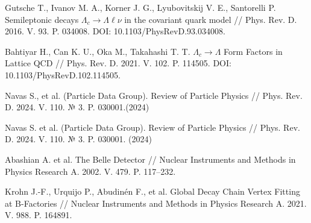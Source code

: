 \begin{thebibliography}{99}
    Gutsche T., Ivanov M. A., Korner J. G., Lyubovitskij V. E., Santorelli P. Semileptonic decays $\Lambda_c \to \Lambda \ell \nu$ in the covariant quark model // Phys. Rev. D. 2016. V. 93. P. 034008. DOI: 10.1103/PhysRevD.93.034008.    
    
    Bahtiyar H., Can K. U., Oka M., Takahashi T. T. $\Lambda_c \to \Lambda$ Form Factors in Lattice QCD // Phys. Rev. D. 2021. V. 102. P. 114505. DOI: 10.1103/PhysRevD.102.114505.    

    Navas S., et al. (Particle Data Group). Review of Particle Physics // Phys. Rev. D. 2024. V. 110. $№$ 3. P. 030001.(2024)
    
    Navas S. et al. (Particle Data Group). Review of Particle Physics // Phys. Rev. D. 2024. V. 110. № 3. P. 030001. (2024)

    Abashian A. et al. The Belle Detector // Nuclear Instruments and Methods in Physics Research A. 2002. V. 479. P. 117–232.
    
    Krohn J.-F., Urquijo P., Abudinén F., et al. Global Decay Chain Vertex Fitting at B-Factories // Nuclear Instruments and Methods in Physics Research A. 2021. V. 988. P. 164891.



\end{thebibliography}